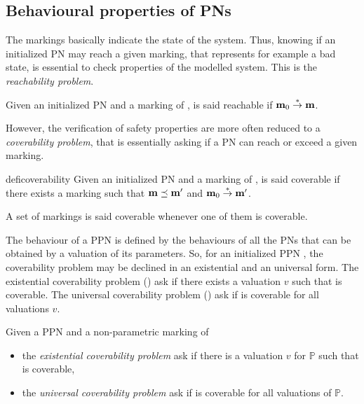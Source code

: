 \subsection{Behavioural properties of \acp{PN}}

The markings basically indicate the state of the system. Thus, knowing if an initialized \ac{PN} may reach a given marking, that represents for example a bad state, is essential to check properties of the modelled system. This is the \emph{reachability problem}.

\begin{defi}[Reachability]
  Given an initialized \ac{PN} \NPTm and a marking \marq of \tupleN, \marq is said reachable if $\mathbf{m}_0 \stackrel{*}{\to} \mathbf{m}$.
\end{defi}

However, the verification of safety properties are more often reduced to a \emph{coverability problem}, that is essentially asking if a \ac{PN} can reach or exceed a given marking.

\begin{restatable}[Coverability]{defi}{coverability}
  Given an initialized \ac{PN} \NPTm and a marking \marq of \tupleN, \marq is said coverable if there exists a marking \marqp such that $\mathbf{m} \preceq \mathbf{m'}$ and $\mathbf{m}_0 \stackrel{*}{\to} \mathbf{m'}$.

  A set of markings is said coverable whenever one of them is coverable.
\end{restatable}

The behaviour of a \ac{PPN} is defined by the behaviours of all the \acp{PN} that can be obtained by a valuation of its parameters.
So, for an initialized \ac{PPN} \tupleS, the coverability problem may be declined in an existential and an universal form.
The existential coverability problem (\Ecov) ask if there exists a valuation $v$ such that \marq is coverable.
The universal coverability problem (\Ucov) ask if \marq is coverable for all valuations $v$.

\begin{defi}
  Given a \ac{PPN} \SPTP and a non-parametric marking \marq of \tupleS
  \begin{itemize}
    \item the \emph{existential coverability problem} ask if there is a valuation $v$ for $\mathbb{P}$ such that \marq is coverable,
    \item the \emph{universal   coverability problem} ask if \marq is coverable for all valuations of $\mathbb{P}$.
  \end{itemize}
\end{defi}


